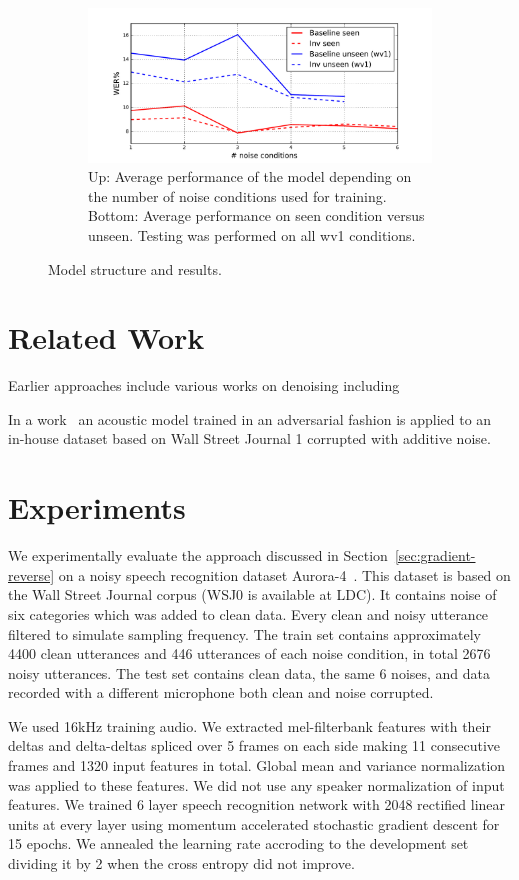 \documentclass{article}
\begin{document}
\begin{figure}
\begin{subfigure}[b]{0.7\linewidth}
        \includegraphics[width=\linewidth]{wer_seen_unseen.pdf}
        \caption{Up: Average performance of the model depending on the number of noise
            conditions used for training. Bottom: Average performance on seen condition versus unseen.
            Testing was performed on all wv1 conditions.
            }
        \label{fig:results}
    \end{subfigure}
    \caption{Model structure and results.}
\end{figure}

\section{Related Work}
    Earlier approaches include various works on denoising including 

    In a work~\cite{yusuke2016adversarial} an acoustic model trained in an adversarial fashion is
    applied to an in-house dataset based on Wall Street Journal 1 corrupted with additive noise.
    

\section{Experiments}
\label{sec:experiments}
We experimentally evaluate the approach discussed in Section~\ref{sec:gradient-reverse} 
on a noisy speech recognition dataset Aurora-4~\cite{parihar2002aurora}. This dataset
is based on the Wall Street Journal corpus (WSJ0 is available at LDC). It contains noise of 
six categories which was added to clean
data. Every clean and noisy utterance filtered to simulate sampling frequency. The train
set contains approximately 4400 clean utterances and 446 utterances of each noise condition,
in total 2676 noisy utterances.
The test
set contains clean data, the same 6 noises, and data recorded with a different microphone
both clean and noise corrupted.

We used 16kHz training audio. We extracted mel-filterbank features with their deltas and 
delta-deltas spliced over 5 frames on each side making 11 consecutive frames and 1320 input 
features in total. Global mean and variance normalization was applied to these features.
We did not use any speaker normalization of input features. We trained 6 layer
speech recognition network with 2048 rectified linear units at every layer using momentum
accelerated stochastic gradient descent for 15 epochs. We annealed the learning rate accroding 
to the development set dividing it by 2 when the cross entropy did not improve.
\end{document}
